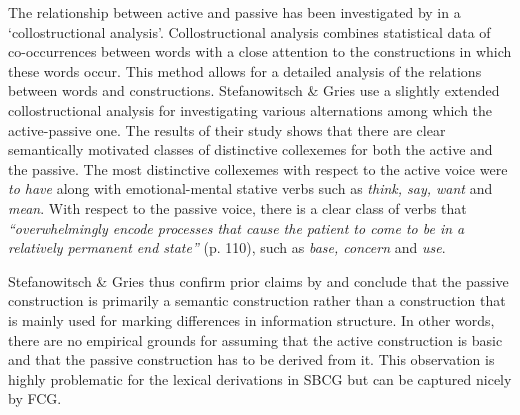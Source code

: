 The relationship between active and passive has been investigated by \citet{stefanowitsch03collostructions} in a `collostructional analysis'. Collostructional analysis combines statistical data of co-occurrences between words with a close attention to the constructions in which these words occur. This method allows for a detailed analysis of the relations between words and constructions. Stefanowitsch \& Gries use a slightly extended collostructional analysis for investigating various alternations among which the active-passive one. The results of their study shows that there are clear semantically motivated classes of distinctive collexemes for both the active and the passive. The most distinctive collexemes with respect to the active voice were {\em to have} along with emotional-mental stative verbs such as {\em think, say, want} and {\em mean}. With respect to the passive voice, there is a clear class of verbs that {\em ``overwhelmingly encode processes that cause the patient to come to be in a relatively permanent end state''} (p. 110), such as {\em base, concern} and {\em use}.

Stefanowitsch \& Gries thus confirm prior claims by \citet{pinker89learnability} and conclude that the passive construction is primarily a semantic construction rather than a construction that is mainly used for marking differences in information structure. In other words, there are no empirical grounds for assuming that the active construction is basic and that the passive construction has to be derived from it. This observation is highly problematic for the lexical derivations in SBCG but can be captured nicely by FCG.



